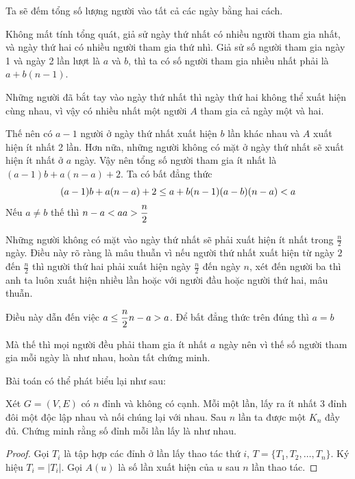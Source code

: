 \documentclass[11pt]{scrartcl}
\begin{document}
\begin{itemize}[label=, leftmargin=0em, itemsep=0.5em]
\begin{sol}
        Ta sẽ đếm tổng số lượng người vào tất cả các ngày bằng hai cách.

        Không mất tính tổng quát, giả sử ngày thứ nhất có nhiều người tham gia nhất, và ngày thứ hai có nhiều người tham gia thứ nhì. Giả sử số người tham gia ngày 1 và ngày 2 lần lượt là $a$ và $b$, thì ta có số người tham gia nhiều nhất phải là $a + b(n - 1)$.


        Những người đã bắt tay vào ngày thứ nhất thì ngày thứ hai không thể xuất hiện cùng nhau, vì vậy có nhiều nhất một người $A$ tham gia cả ngày một và hai.


        Thế nên có $a - 1$ người ở ngày thứ nhất xuất hiện $b$ lần khác nhau và $A$ xuất hiện ít nhất 2 lần. Hơn nữa, những người không có mặt ở ngày thứ nhất sẽ xuất hiện ít nhất ở $a$ ngày. Vậy nên tổng số người tham gia ít nhất là $(a - 1)b + a(n-a) + 2$. Ta có bất đẳng thức 
        \[
            (a - 1)b + a(n - a) + 2 \leq a + b( n - 1) \lra (a - b)( n - a ) < a
        \]
        Nếu $a \neq b$ thế thì $n - a < a \lra a > \frac{n}{2}$
        
        
        Những người không có mặt vào ngày thứ nhất sẽ phải xuất hiện ít nhất trong $\frac{n}{2}$ ngày. Điều này rõ ràng là mâu thuẫn vì nếu người thứ nhất xuất hiện từ ngày $2$ đến $\frac{n}{2}$ thì người thứ hai phải xuất hiện ngày $\frac{n}{2}$ đến ngày $n$, xét đến người ba thì anh ta luôn xuất hiện nhiều lần hoặc với người đầu hoặc người thứ hai, mâu thuẫn.


        Điều này dẫn đến việc $a \leq \frac{n}{2} \lra n - a > a$. Để bất đẳng thức trên đúng thì $a = b$



        Mà thế thì mọi người đều phải tham gia ít nhất $a$ ngày nên vì thế số người tham gia mỗi ngày là như nhau, hoàn tất chứng minh.

    \end{sol}
    
     Bài toán có thể phát biểu lại như sau:
    \begin{lemma}
        Xét $G = (V,E)$ có $n$ đỉnh và không có cạnh. Mỗi một lần, lấy ra ít nhất 3 đỉnh đôi một độc lập nhau và nối chúng lại với nhau. Sau $n$ lần ta được một $K_n$ đầy đủ. Chứng minh rằng số đỉnh mỗi lần lấy là như nhau.
    \end{lemma}
    \begin{proof}
        
        Gọi $T_i$ là tập hợp các đỉnh ở lần lấy thao tác thứ $i$, $T = \{T_1,T_2,\dots,T_n\}$. Ký hiệu $T_i = |T_i|$. Gọi $A(u)$ là số lần xuất hiện của $u$ sau $n$ lần thao tác. 


\end{proof}
\end{itemize}
\end{document}
